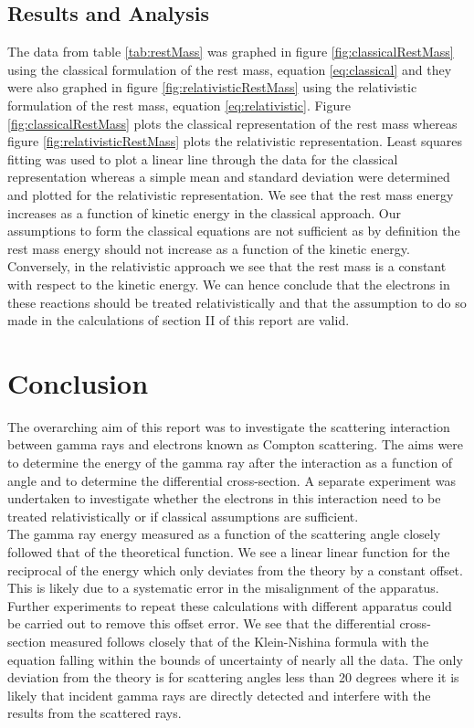 \documentclass[%
reprint,
amsmath,amssymb,
aps,
floatfix
]{revtex4-2}
\begin{document}
		\subsection{Results and Analysis}
			The data from table \ref{tab:restMass} was graphed in figure \ref{fig:classicalRestMass} using the classical formulation of the rest mass, equation \ref{eq:classical} and they were also graphed in figure \ref{fig:relativisticRestMass} using the relativistic formulation of the rest mass, equation \ref{eq:relativistic}. Figure \ref{fig:classicalRestMass} plots the classical representation of the rest mass whereas figure \ref{fig:relativisticRestMass} plots the relativistic representation. Least squares fitting was used to plot a linear line through the data for the classical representation whereas a simple mean and standard deviation were determined and plotted for the relativistic representation. We see that the rest mass energy increases as a function of kinetic energy in the classical approach. Our assumptions to form the classical equations are not sufficient as by definition the rest mass energy should not increase as a function of the kinetic energy. Conversely, in the relativistic approach we see that the rest mass is a constant with respect to the kinetic energy. We can hence conclude that the electrons in these reactions should be treated relativistically and that the assumption to do so made in the calculations of section II of this report are valid.

	\section{Conclusion}
		The overarching aim of this report was to investigate the scattering interaction between gamma rays and electrons known as Compton scattering. The aims were to determine the energy of the gamma ray after the interaction as a function of angle and to determine the differential cross-section. A separate experiment was undertaken to investigate whether the electrons in this interaction need to be treated relativistically or if classical assumptions are sufficient.\\
		
		The gamma ray energy measured as a function of the scattering angle closely followed that of the theoretical function. We see a linear linear function for the reciprocal of the energy which only deviates from the theory by a constant offset. This is likely due to a systematic error in the misalignment of the apparatus. Further experiments to repeat these calculations with different apparatus could be carried out to remove this offset error. We see that the differential cross-section measured follows closely that of the Klein-Nishina formula with the equation falling within the bounds of uncertainty of nearly all the data. The only deviation from the theory is for scattering angles less than 20 degrees where it is likely that incident gamma rays are directly detected and interfere with the results from the scattered rays.\\
		
\end{document}
